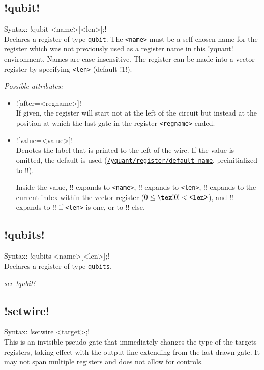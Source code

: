 \documentclass{scrartcl}
\def\style#1{\hyperref[style:#1]{\texttt{#1}}}
\begin{document}
      \subsection{\texorpdfstring{\yquant!qubit!}{qubit}}\label{gate:qubit}
         Syntax: \yquant!qubit <name>[<len>];! \\
         Declares a register of type \texttt{qubit}.
         The \texttt{<name>} must be a self\hyp chosen name for the register which was not previously used as a register name in this \tex!yquant! environment.
         Names are case\hyp insensitive.
         The register can be made into a vector register by specifying \texttt{<len>} (default \tex!1!).
         
         \emph{Possible attributes:}
         \begin{itemize}
            \item \yquant![after=<regname>]! \\
               If given, the register will start not at the left of the circuit but instead at the position at which the last gate in the register \texttt{<regname>} ended.
            \item \yquant![value=<value>]! \\
               Denotes the label that is printed to the left of the wire.
               If the value is omitted, the default is used (\style{/yquant/register/default name}, preinitialized to \tex!\regidx!).
               
               Inside the value, \tex!\reg! expands to \texttt{<name>}, \tex!\len! expands to \texttt{<len>}, \tex!\idx! expands to the current index within the vector register ($0 \leq \text{\tex!\idx!} < \text{\texttt{<len>}}$), and \tex!\regidx! expands to \tex!\reg! if \texttt{<len>} is one, or to \tex!\reg[\idx]! else.
         \end{itemize}
      
      \subsection{\texorpdfstring{\yquant!qubits!}{qubits}}\label{gate:qubits}
         Syntax: \yquant!qubits <name>[<len>];! \\
         Declares a register of type \texttt{qubits}.
         
         \emph{see \hyperref[gate:qubit]{\yquant!qubit!}}
      
      \subsection{\texorpdfstring{\yquant!setwire!}{setwire}}\label{gate:setwire}
         Syntax: \yquant!setwire <target>;! \\
         This is an invisible pseudo\hyp gate that immediately changes the type of the targets registers, taking effect with the output line extending from the last drawn gate.
         It may not span multiple registers and does not allow for controls.
         
\end{document}
